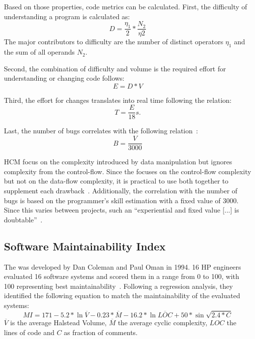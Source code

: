 Based on those properties, code metrics can be calculated. 
First, the difficulty of understanding a program is calculated as:
\begin{displaymath}
    D = \frac{\eta_1}{2} * \frac{N_2}{\eta2}
\end{displaymath}
The major contributors to difficulty are the number of distinct operators $\eta_1$ and the sum of all operands $N_2$.

Second, the combination of difficulty and volume is the required effort for understanding or changing code follows:
\begin{displaymath}
    E = D * V
\end{displaymath}

Third, the effort for changes translates into real time following the relation:
\begin{displaymath}
    T = \frac{E}{18}s.
\end{displaymath}

Last, the number of bugs correlates with the following relation~\cite{yu_survey_2010}:
\begin{displaymath}
    B = \frac{V}{3000}
\end{displaymath}

HCM focus on the complexity introduced by data manipulation but ignores complexity from the control-flow. Since the  focuses on the control-flow complexity but not on the data-flow complexity, it is practical to use both together to supplement each drawback~\cite{yu_survey_2010}.
Additionally, the correlation with the number of bugs is based on the programmer's skill estimation with a fixed value of 3000. Since this varies between projects, such an \enquote{experiential and fixed value [...] is doubtable}~\cite{yu_survey_2010}.

\subsection{Software Maintainability Index}
The  was developed by Dan Coleman and Paul Oman in 1994. 16 HP engineers evaluated 16 software systems and scored them in a range from 0 to 100, with 100 representing best maintainability~\cite{coleman_using_1994}. 
Following a regression analysis, they identified the following equation to match the maintainability of the evaluated systems:
\begin{displaymath}
MI = 171 - 5.2 *\ln{\overline{V}} - 0.23 * \overline{M} - 16.2 * \ln{\overline{LOC}} + 50 * \sin{\sqrt{2.4 * C}}
\end{displaymath}
$\overline{V}$ is the average Halstead Volume, $\overline{M}$ the average cyclic complexity, $LOC$ the lines of code and $C$ as fraction of comments.

